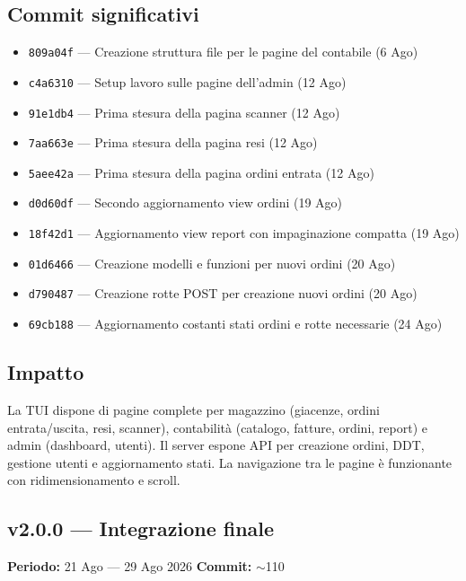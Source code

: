 \documentclass[a4paper,12pt]{article}
\begin{document}
\subsection*{Commit significativi}
\begin{itemize}
    \item \texttt{809a04f} --- Creazione struttura file per le pagine del contabile (6 Ago)
    \item \texttt{c4a6310} --- Setup lavoro sulle pagine dell'admin (12 Ago)
    \item \texttt{91e1db4} --- Prima stesura della pagina scanner (12 Ago)
    \item \texttt{7aa663e} --- Prima stesura della pagina resi (12 Ago)
    \item \texttt{5aee42a} --- Prima stesura della pagina ordini entrata (12 Ago)
    \item \texttt{d0d60df} --- Secondo aggiornamento view ordini (19 Ago)
    \item \texttt{18f42d1} --- Aggiornamento view report con impaginazione compatta (19 Ago)
    \item \texttt{01d6466} --- Creazione modelli e funzioni per nuovi ordini (20 Ago)
    \item \texttt{d790487} --- Creazione rotte POST per creazione nuovi ordini (20 Ago)
    \item \texttt{69cb188} --- Aggiornamento costanti stati ordini e rotte necessarie (24 Ago)
\end{itemize}

\subsection*{Impatto}
La TUI dispone di pagine complete per magazzino (giacenze, ordini entrata/uscita, resi, scanner), contabilit\`{a} (catalogo, fatture, ordini, report) e admin (dashboard, utenti). Il server espone API per creazione ordini, DDT, gestione utenti e aggiornamento stati. La navigazione tra le pagine \`{e} funzionante con ridimensionamento e scroll.

\newpage

\begin{decisionbox}
\section*{v2.0.0 --- Integrazione finale}
\textbf{Periodo:} 21 Ago --- 29 Ago 2026 \hfill \textbf{Commit:} $\sim$110
\end{decisionbox}
\end{document}
